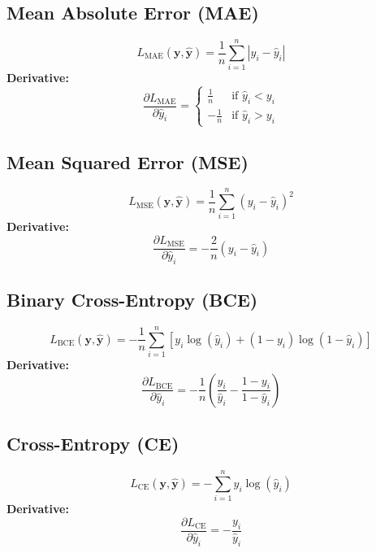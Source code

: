 \documentclass{article}
\begin{document}
\subsection{Mean Absolute Error (MAE)}
\begin{equation}
L_{\text{MAE}}(\mathbf{y}, \hat{\mathbf{y}}) = \frac{1}{n} \sum_{i=1}^{n} |y_i - \hat{y}_i|
\end{equation}
\textbf{Derivative:}
\begin{equation}
\frac{\partial L_{\text{MAE}}}{\partial \hat{y}_i} = 
\begin{cases} 
\frac{1}{n} & \text{if } \hat{y}_i < y_i \\
-\frac{1}{n} & \text{if } \hat{y}_i > y_i 
\end{cases}
\end{equation}

\subsection{Mean Squared Error (MSE)}
\begin{equation}
L_{\text{MSE}}(\mathbf{y}, \hat{\mathbf{y}}) = \frac{1}{n} \sum_{i=1}^{n} (y_i - \hat{y}_i)^2
\end{equation}
\textbf{Derivative:}
\begin{equation}
\frac{\partial L_{\text{MSE}}}{\partial \hat{y}_i} = -\frac{2}{n} (y_i - \hat{y}_i)
\end{equation}

\subsection{Binary Cross-Entropy (BCE)}
\begin{equation}
L_{\text{BCE}}(\mathbf{y}, \hat{\mathbf{y}}) = -\frac{1}{n} \sum_{i=1}^{n} \left[ y_i \log(\hat{y}_i) + (1 - y_i) \log(1 - \hat{y}_i) \right]
\end{equation}
\textbf{Derivative:}
\begin{equation}
\frac{\partial L_{\text{BCE}}}{\partial \hat{y}_i} = -\frac{1}{n} \left( \frac{y_i}{\hat{y}_i} - \frac{1 - y_i}{1 - \hat{y}_i} \right)
\end{equation}

\subsection{Cross-Entropy (CE)}
\begin{equation}
L_{\text{CE}}(\mathbf{y}, \hat{\mathbf{y}}) = -\sum_{i=1}^{n} y_i \log(\hat{y}_i)
\end{equation}
\textbf{Derivative:}
\begin{equation}
\frac{\partial L_{\text{CE}}}{\partial \hat{y}_i} = -\frac{y_i}{\hat{y}_i}
\end{equation}
\end{document}
